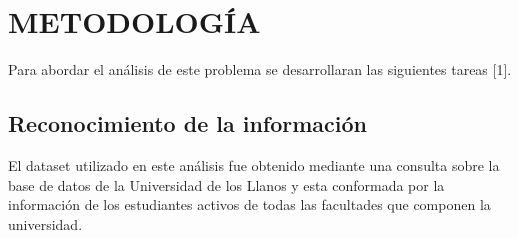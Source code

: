 \section{METODOLOGÍA}



 Para abordar el análisis de este problema se desarrollaran las siguientes tareas [1].
 
  \subsection{Reconocimiento de la información}
 
 El dataset utilizado en este análisis fue obtenido mediante una consulta sobre la base de datos de la Universidad de los Llanos y esta conformada por la información de los estudiantes activos de todas las facultades que componen la universidad.
  
